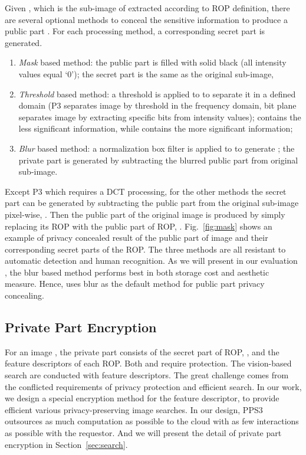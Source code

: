 {Given , which is the sub-image of  extracted according to ROP definition,
 there are several optional methods to conceal
 the sensitive information to produce a public part .
For each processing method,
 a corresponding secret part  is generated.
\begin{enumerate}
\item \emph{Mask} based method: the public part  is filled with solid black (all intensity values equal `0'); the secret part is the same as the original sub-image,
\item \emph{Threshold} based method: a threshold is applied to  to
  separate it in a defined domain (\eg P3 separates image by threshold
  in the frequency domain, bit plane separates image by extracting
  specific bits from intensity values);  contains
  the less significant information, while 
  contains the more significant information;
\item \emph{Blur} based method: a normalization box filter is applied to
   to generate ; the private part is
  generated by subtracting the blurred public part from original
  sub-image.
\end{enumerate}
Except P3 which requires a DCT processing,
 for the other methods the secret part can be generated by
 subtracting the public part from the original sub-image pixel-wise,
 \ie .
Then the public part of the  original image 
 is produced by simply replacing its ROP with the public part
 of ROP, \ie .
Fig.~\ref{fig:mask} shows an example of privacy concealed result of the public part
 of image and their corresponding secret parts of the ROP.
The three methods are all resistant to automatic detection and human recognition.
As we will present in our evaluation ,
 the blur based method performs best in both storage cost and aesthetic measure.
Hence, \ourprotocol uses blur as the default method
 for public part privacy concealing.



\subsection{Private Part Encryption}



For an image , the private part consists of the secret part of ROP, \ie ,
 and the feature descriptors  of each ROP.
Both  and  require protection.
The vision-based search are conducted with feature descriptors.
The great challenge comes from the
 conflicted requirements of privacy protection and efficient search.
In our work, we design a special encryption method for the feature descriptor,
 to provide efficient various privacy-preserving image searches.
In our design, PPS3  outsources as much computation as possible
 to the  cloud with as few interactions as possible with the
 requestor.
And we will present the detail of private part encryption in Section~\ref{sec:search}.




}
